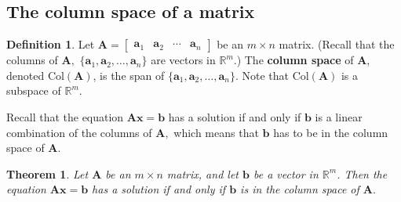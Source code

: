 \documentclass[
]{book}
\newtheorem{theorem}{Theorem}[chapter]
\theoremstyle{definition}
\newtheorem{definition}{Definition}[chapter]
\theoremstyle{definition}
\theoremstyle{definition}
\theoremstyle{definition}
\theoremstyle{remark}
\begin{document}
\subsection*{The column space of a matrix}\label{the-column-space-of-a-matrix}

\begin{defbox}

\begin{definition}
Let \(\mathbf{A}=\begin{bmatrix}\mathbf{a}_1 & \mathbf{a}_2&\cdots & \mathbf{a}_n\end{bmatrix}\) be an \(m\times n\) matrix. (Recall that the columns of \(\mathbf{A},\) \(\{\mathbf{a}_1,\mathbf{a}_2,\dots,\mathbf{a}_n\}\) are vectors in \(\mathbb{R}^m\).)
The \textbf{column space} of \(\mathbf{A},\) denoted \(\text{Col}(\mathbf{A})\), is the span of \(\{\mathbf{a}_1,\mathbf{a}_2,\dots,\mathbf{a}_n\}\).
Note that \(\text{Col}(\mathbf{A})\) is a subspace of \(\mathbb{R}^m\).
\end{definition}

\end{defbox}

Recall that the equation \(\mathbf{A}\mathbf{x}=\mathbf{b}\) has a solution if and only if \(\mathbf{b}\) is a linear combination of the columns of \(\mathbf{A},\) which means that \(\mathbf{b}\) has to be in the column space of \(\mathbf{A}.\)

\begin{theorembox}

\begin{theorem}
Let \(\mathbf{A}\) be an \(m\times n\) matrix, and let \(\mathbf{b}\) be a vector in \(\mathbb{R}^m\). Then the equation \(\mathbf{A}\mathbf{x}=\mathbf{b}\) has a solution if and only if \(\mathbf{b}\) is in the column space of \(\mathbf{A}.\)
\end{theorem}

\end{theorembox}
\end{document}
